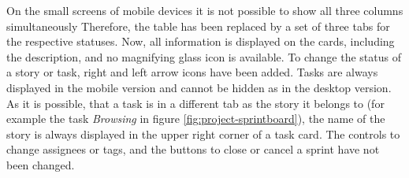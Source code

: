 \documentclass[
	accentcolor=tud1a %
]{tudreport}
\begin{document}
On the small screens of mobile devices it is not possible to show all three columns simultaneously Therefore, the table has been replaced by a set of three tabs for the respective statuses. Now, all information is displayed on the cards, including the description, and no magnifying glass icon is available. To change the status of a story or task, right and left arrow icons have been added. Tasks are always displayed in the mobile version and cannot be hidden as in the desktop version. As it is possible, that a task is in a different tab as the story it belongs to (for example the task \emph{Browsing} in figure \ref{fig:project-sprintboard}), the name of the story is always displayed in the upper right corner of a task card. The controls to change assignees or tags, and the buttons to close or cancel a sprint have not been changed.
\end{document}
